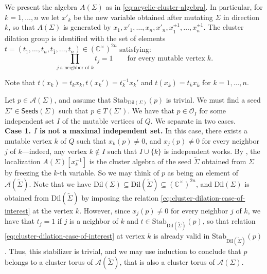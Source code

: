 \documentclass{amsart}
\newcommand{\seed}{\Sigma}
\newcommand{\var}{\mathcal{A}}
\newcommand{\Stab}{\mathrm{Stab}}
\newcommand{\C}{\mathbb{C}}
\newcommand{\seeds}{\mathsf{Seeds}}
\numberwithin{equation}{section}
\theoremstyle{definition}
\newcommand{\dil}{\mathrm{Dil}}
\begin{document}
We present the algebra $A(\seed)$ as in \eqref{eq:acyclic-cluster-algebra}. In particular, for $k = 1, \dots, n$ we let $x'_k$ be the new variable obtained after mutating $\seed$ in direction $k$, so that $A(\seed)$ is generated by $x_1,x'_1, \dots, x_n, x'_n, x_{\overline{1}}^{\pm1}, \dots, x_{\overline{n}}^{\pm 1}$.  The cluster dilation group is identified with the set of elements $t = (t_1, \dots, t_n, t_{\overline{1}}, \dots, t_{\overline{n}}) \in (\C^{\times})^{2n}$ satisfying:
\begin{equation}\label{eq:cluster-dilation-case-of-interest}
\prod_{j \; \text{a neighbor of $k$}} t_j = 1 \qquad 
 \text{for every mutable vertex} \; k.
 \end{equation}

Note that $t(x_{k}) = t_kx_k, t(x_k')= t_k^{-1}x_k'$ 
and $t(x_{\overline{k}}) = t_{\overline{k}}x_{\overline{k}}$ for $k = 1, \dots, n$. 
 
Let $p \in \var(\seed)$, and assume that $\Stab_{\dil(\seed)}(p)$ is trivial. We must find a seed $\seed' \in \seeds(\seed)$ such that $p \in T(\seed')$. We have that $p \in \mathcal{O}_I$ for some independent set $I$ of the mutable vertices of $Q$. We separate in two cases. \\

{\bf Case 1. $I$ is not a maximal independent set.} In this case, there exists a mutable vertex $k$ of $Q$ such that $x_k(p) \neq 0$, and $x_j(p) \neq 0$ for every neighbor $j$ of $k$---indeed, any vertex $k\notin I$ such that $I\cup\{k\}$ is independent works. By \cite[Lemma 3.4]{muller}, the localization $A(\seed)[x_k^{-1}]$ is the cluster algebra of the seed $\widetilde{\seed}$ obtained from $\seed$ by freezing the $k$-th variable. So we may think of $p$ as being an element of $\var(\widetilde{\seed})$. Note that we have $\dil(\seed) \subseteq \dil(\widetilde{\seed}) \subseteq (\C^{\times})^{2n}$, and $\dil(\seed)$ is obtained from $\dil(\widetilde{\seed})$ by imposing the relation \eqref{eq:cluster-dilation-case-of-interest} at the vertex $k$. However, since $x_j(p) \neq 0$ for every neighbor $j$ of $k$, we have that $t_j = 1$ if $j$ is a neighbor of $k$ and $t \in \Stab_{\dil(\widetilde{\seed})}(p)$, so that relation \eqref{eq:cluster-dilation-case-of-interest} at vertex $k$ is already valid in $\Stab_{\dil(\widetilde{\seed})}(p)$. Thus, this stabilizer is trivial, and we may use induction to conclude that $p$ belongs to a cluster torus of $\var(\widetilde{\seed})$, that is also a cluster torus of $\var(\seed)$.  \\
\end{document}
